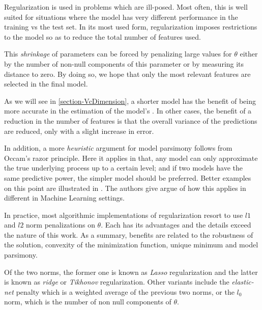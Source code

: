 Regularization is used in problems which are ill-posed.
Most often, this is well suited for situations where the model has very different performance in the training vs the test set.
In its most used form, regularization imposes restrictions to the model so as to reduce the total number of features used.

This \textit{shrinkage} of parameters can be forced by penalizing large values for $\theta$ either by the number of non-null components of this parameter or by measuring its distance to zero.
By doing so, we hope that only the most relevant features are selected in the final model.

As we will see in \cref{section-VcDimension}, a shorter model has the benefit of being more accurate in the estimation of the model's .
In other cases, the benefit of a reduction in the number of features is that the overall variance of the predictions are reduced, only with a slight increase in error.

In addition, a more \textit{heuristic} argument for model parsimony follows from Occam's razor principle.
Here it applies in that, any model can only approximate the true underlying process up to a certain level; and if two models have the same predictive power, the simpler model should be preferred.
Better examples on this point are illustrated in \cite{rasmussenGhahramani2001occamsRazor}.
The authors give argue of how this applies in different in Machine Learning settings.


In practice, most algorithmic implementations of regularization resort to use $l1$ and $l2$ norm penalizations on $\theta$.
Each has its advantages and the details exceed the nature of this work.
As a summary, benefits are related to the robustness of the solution, convexity of the minimization function, unique minimum and model parsimony.

Of the two norms, the former one is known as \textit{ Lasso} regularization and the latter is known as \textit{ridge} or \textit{Tikhonov} regularization.
Other variants include the \textit{elastic-net} penalty which is a weighted average of the previous two norms, or the $l_0$ norm, which is the number of non null components of $\theta$.


